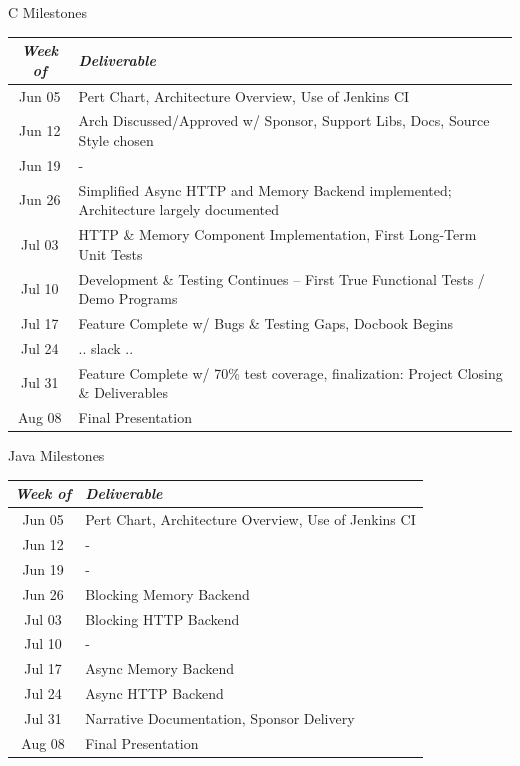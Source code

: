 \documentclass{beamer}
\begin{document}
\begin{frame}{C Milestones}
  \begin{center}{\small
    \begin{tabular}{| c | p{10cm} |}
      \hline
      \emph{Week of} & \emph{Deliverable}\\ \hline \hline
      Jun 05 & Pert Chart, Architecture Overview, Use of Jenkins CI \\ \hline
      Jun 12 & Arch Discussed/Approved w/ Sponsor, Support Libs, Docs, Source Style chosen\\ \hline
      Jun 19 & -\\ \hline
      Jun 26 & Simplified Async HTTP and  Memory Backend implemented; Architecture largely documented\\ \hline
      Jul 03 & HTTP \& Memory Component Implementation, First Long-Term Unit Tests\\ \hline
      Jul 10 & Development \& Testing Continues -- First True Functional Tests / Demo Programs\\ \hline
      Jul 17 & Feature Complete w/ Bugs \& Testing Gaps, Docbook Begins\\ \hline
      Jul 24 & .. slack ..\\ \hline
      Jul 31 & Feature Complete w/ 70\% test coverage, finalization: Project Closing \& Deliverables\\\hline
      Aug 08 & Final Presentation\\ \hline
    \end{tabular}
    }
  \end{center}
\end{frame}

\begin{frame}{Java Milestones}
  \begin{center}
    \begin{tabular}{| c | l |}
      \hline
      \emph{Week of} & \emph{Deliverable}\\ \hline \hline
      Jun 05 & Pert Chart, Architecture Overview, Use of Jenkins CI \\ \hline
      Jun 12 & -\\ \hline
      Jun 19 & -\\ \hline
      Jun 26 & Blocking Memory Backend\\ \hline
      Jul 03 & Blocking HTTP Backend\\ \hline
      Jul 10 & -\\ \hline
      Jul 17 & Async Memory Backend\\ \hline
      Jul 24 & Async HTTP Backend\\ \hline
      Jul 31 & Narrative Documentation, Sponsor Delivery\\\hline
      Aug 08 & Final Presentation\\ \hline
    \end{tabular}
    \end{center}
\end{frame}
\end{document}
